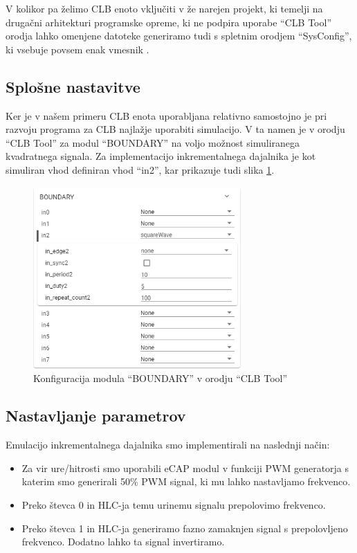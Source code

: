 \documentclass[a4paper]{article}
\begin{document}
\begin{sloppypar}
V kolikor pa želimo CLB enoto vključiti v že narejen projekt, ki temelji na
drugačni arhitekturi programske opreme, ki ne podpira uporabe ``CLB Tool''
orodja lahko omenjene datoteke generiramo tudi s spletnim orodjem
``SysConfig'', ki vsebuje povsem enak vmesnik \cite{sysconfig}.

\subsection{Splošne nastavitve}
Ker je v našem primeru CLB enota uporabljana relativno samostojno je pri
razvoju programa za CLB najlažje uporabiti simulacijo.  V ta namen je v orodju
``CLB Tool'' za modul ``BOUNDARY'' na voljo možnost simuliranega kvadratnega
signala. Za implementacijo inkrementalnega dajalnika je kot simuliran vhod
definiran vhod ``in2'', kar prikazuje tudi slika \ref{fig:clbtool_boundary}.

\begin{figure}[htb]
    \centerline{\includegraphics[width=8cm]{clbtool_boundary}}
    \caption{Konfiguracija modula ``BOUNDARY'' v orodju ``CLB Tool''}
    \label{fig:clbtool_boundary} 
\end{figure} 

\subsection{Nastavljanje parametrov}\label{sec:nastavljanje_clb}
Emulacijo inkrementalnega dajalnika smo implementirali na naslednji način:
\begin{itemize}
    \item Za vir ure/hitrosti smo uporabili eCAP modul v funkciji PWM
        generatorja s katerim smo generirali 50\% PWM signal, ki mu lahko
        nastavljamo frekvenco.
    \item Preko števca 0 in HLC-ja temu urinemu signalu prepolovimo frekvenco.
    \item Preko števca 1 in HLC-ja generiramo fazno zamaknjen signal s
        prepolovljeno frekvenco. Dodatno lahko ta signal invertiramo.
\end{itemize}


\end{sloppypar}
\end{document}
